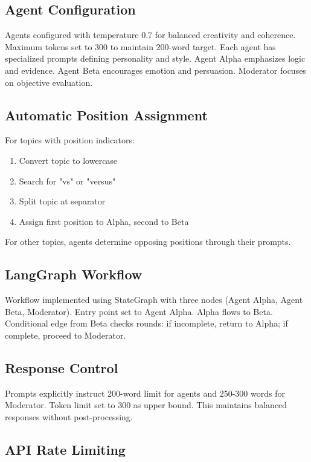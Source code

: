 \documentclass[conference]{IEEEtran}
\begin{document}
\subsection{Agent Configuration}

Agents configured with temperature 0.7 for balanced creativity and coherence. Maximum tokens set to 300 to maintain 200-word target. Each agent has specialized prompts defining personality and style. Agent Alpha emphasizes logic and evidence. Agent Beta encourages emotion and persuasion. Moderator focuses on objective evaluation.

\subsection{Automatic Position Assignment}

For topics with position indicators:
\begin{enumerate}
\item Convert topic to lowercase
\item Search for "vs" or "versus"
\item Split topic at separator
\item Assign first position to Alpha, second to Beta
\end{enumerate}

For other topics, agents determine opposing positions through their prompts.

\subsection{LangGraph Workflow}

Workflow implemented using StateGraph with three nodes (Agent Alpha, Agent Beta, Moderator). Entry point set to Agent Alpha. Alpha flows to Beta. Conditional edge from Beta checks rounds: if incomplete, return to Alpha; if complete, proceed to Moderator.

\subsection{Response Control}

Prompts explicitly instruct 200-word limit for agents and 250-300 words for Moderator. Token limit set to 300 as upper bound. This maintains balanced responses without post-processing.

\subsection{API Rate Limiting}
\end{document}
